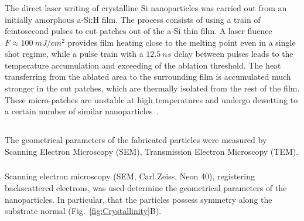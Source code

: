         \subsubsection{}
                The direct laser writing of crystalline Si nanoparticles was carried out from an initially amorphous a-Si:H film.
            The process consists of using a train of femtosecond pulses to cut patches out of the a-Si thin film\cite{makarov2016controllable,
            dmitriev2016direct}. A laser fluence $F\approx100~\si{mJ/cm^{2}}$ provides film heating close to the melting point even in a
            single shot regime, while a pulse train with a $12.5~\si{ns}$ delay between pulses leads to the temperature accumulation
            and exceeding of the ablation threshold. The heat transferring from the ablated area to the surrounding film is accumulated
            much stronger in the cut patches, which are thermally isolated from the rest of the film.
            These micro-patches are unstable at high temperatures and undergo dewetting to a certain number of similar
            nanoparticles~\cite{thompson2012solid}.


    \subsection{}
    \label{sec:SEM}
            The geometrical parameters of the fabricated particles were measured by Scanning Electron Microscopy (SEM),
        Transmission Electron Microscopy (TEM).

        \subsubsection{}
                Scanning electron microscopy (SEM, Carl Zeiss, Neon 40), registering backscattered electrons, was used
            determine the geometrical parameters of the nanoparticles. In particular, that the particles possess 
            symmetry along the substrate normal (Fig.~\ref{fig:Crystallinity}B).


